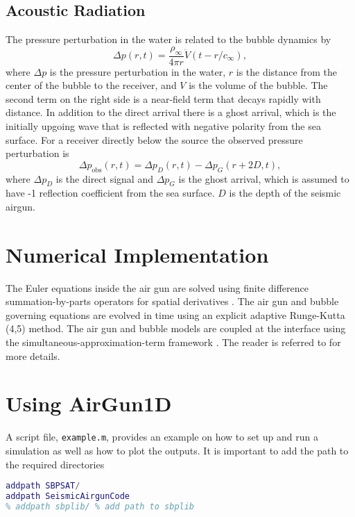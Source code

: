 \documentclass[10pt]{article}
\begin{document}
\subsection{Acoustic Radiation}
The pressure perturbation in the water is related to the bubble dynamics by \citep{Keller1956}
\begin{equation}
\Delta p(r,t) = \frac{\rho_\infty}{4\pi r} {\ddot{V}(t-r/c_\infty)},
\label{eq:acoustic radiation}
\end{equation}
where $\Delta p$ is the pressure perturbation in the water, $r$ is the distance from the center of the bubble to the receiver, and $V$ is the volume of the bubble. The second term on the right side is a near-field term that decays rapidly with distance. In addition to the direct arrival there is a ghost arrival, which is the initially upgoing wave that is reflected with negative polarity from the sea surface. For a receiver directly below the source the observed pressure perturbation is
\begin{equation}
\Delta p_\text{obs}(r,t) = \Delta p_D(r,t) - \Delta p_G(r+2D,t),
\end{equation}
where $\Delta p_D$ is the direct signal and $\Delta p_G$ is the ghost arrival, which is assumed to have -1 reflection coefficient from the sea surface. $D$ is the depth of the seismic airgun.

\section{Numerical Implementation}
The Euler equations inside the air gun are solved using finite difference summation-by-parts operators for spatial derivatives \citep{Svard2014}. The air gun and bubble governing equations are evolved in time using an explicit adaptive Runge-Kutta (4,5) method. The air gun and bubble models are coupled at the interface using the simultaneous-approximation-term framework \citep{Carpenter1994,DelReyFernandez2014a,Svard2014}.
The reader is referred to \citet{Watson2019_airgun} for more details.

\section{Using {\bf AirGun1D}}
A script file, \texttt{example.m}, provides an example on how to set up and run a simulation as well as how to plot the outputs. It is important to add the path to the required directories
\begin{lstlisting}[language=Matlab]
addpath SBPSAT/
addpath SeismicAirgunCode
% addpath sbplib/ % add path to sbplib
\end{lstlisting}
\end{document}
